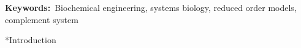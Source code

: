 \documentclass[12pt]{article}
\makeatletter
\renewcommand\section{\@startsection
	{subsection}{2}{0mm}
	{-0.2in}
	{0.05\baselineskip}
	{\normalfont\large\bfseries}}
\makeatother
\begin{document}
\vspace{0.1in}
{\noindent \textbf{Keywords:}~Biochemical engineering, systems biology, reduced order models, complement system}

\pagebreak

\setcounter{page}{1}

\linenumbers


\section*{Introduction}



\end{document}
